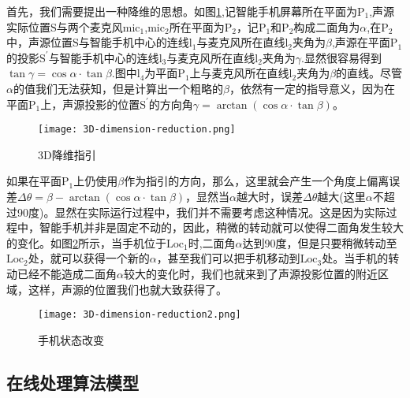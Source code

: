 \documentclass[winfonts]{njuthesis}
\begin{document}
			首先，我们需要提出一种降维的思想。如图\ref{fig: 3D-dimension-reduction},记智能手机屏幕所在平面为$\text{P}_1$,声源实际位置$\text{S}$与两个麦克风$\text{mic}_1$,$\text{mic}_2$所在平面为$\text{P}_2$，记$\text{P}_1$和$\text{P}_2$构成二面角为$\alpha$,在$\text{P}_2$中，声源位置$\text{S}$与智能手机中心的连线$\text{l}_1$与麦克风所在直线$\text{l}_2$夹角为$\beta$,声源在平面$\text{P}_1$的投影$\text{S}^{'}$与智能手机中心的连线$\text{l}_3$与麦克风所在直线$\text{l}_2$夹角为$\gamma$.显然很容易得到$\tan \gamma = \cos \alpha \cdot \tan \beta$.图中$\text{l}_4$为平面$\text{P}_1$上与麦克风所在直线$\text{l}_2$夹角为$\beta$的直线。尽管$\alpha$的值我们无法获知，但是计算出一个粗略的$\beta$，依然有一定的指导意义，因为在平面$\text{P}_1$上，声源投影的位置$\text{S}^{'}$的方向角$\gamma = \arctan (\cos \alpha \cdot \tan \beta)$。
			
			\begin{figure}[H]
				\centering
				\texttt{[image: 3D-dimension-reduction.png]} 
				\caption{{3D降维指引}}
				\label{fig: 3D-dimension-reduction}
			\end{figure}
			
			如果在平面$\text{P}_1$上仍使用$\beta$作为指引的方向，那么，这里就会产生一个角度上偏离误差$\Delta \theta = \beta - \arctan (\cos \alpha \cdot \tan \beta)$，显然当$\alpha$越大时，误差$\Delta \theta$越大(这里$\alpha$不超过90度)。显然在实际运行过程中，我们并不需要考虑这种情况。这是因为实际过程中，智能手机并非是固定不动的，因此，稍微的转动就可以使得二面角发生较大的变化。如图\ref{fig: 3D-dimension-reduction2}所示，当手机位于$\text{Loc}_1$时,二面角$\alpha$达到90度，但是只要稍微转动至$\text{Loc}_2$处，就可以获得一个新的$\alpha$，甚至我们可以把手机移动到$\text{Loc}_3$处。当手机的转动已经不能造成二面角$\alpha$较大的变化时，我们也就来到了声源投影位置的附近区域，这样，声源的位置我们也就大致获得了。
			
			\begin{figure}[H]
				\centering
				\texttt{[image: 3D-dimension-reduction2.png]} 
				\caption{{手机状态改变}}
				\label{fig: 3D-dimension-reduction2}
			\end{figure}	
		
		\subsection{在线处理算法模型}
			
\end{document}
